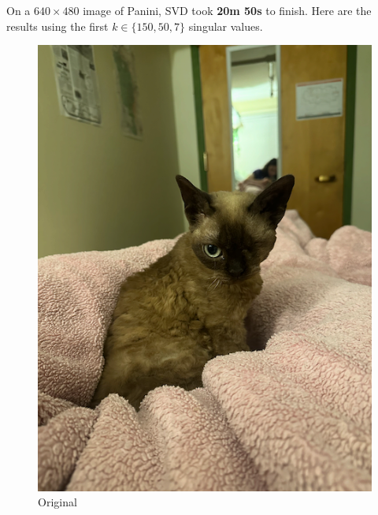 On a $640 \times 480$ image of Panini, SVD took \textbf{20m 50s} to finish. Here are the results 
using the first $k \in \{150, 50, 7\}$ singular values.

\begin{figure}[H]
  \centering
  \begin{minipage}[b]{0.4\textwidth}
    \includegraphics[width=\textwidth]{images/cat.png}
    \caption{Original}
  \end{minipage}
  \hfill
  \begin{minipage}[b]{0.4\textwidth}

\end{minipage}
\end{figure}
